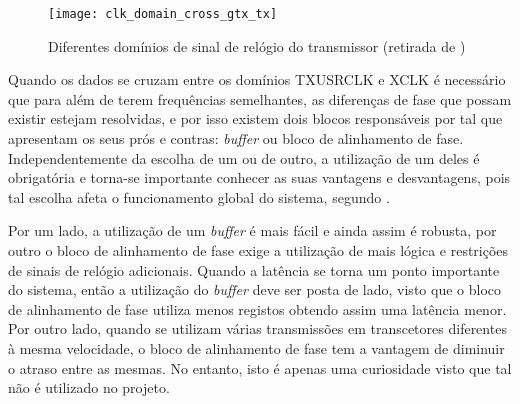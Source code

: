\begin{figure}[h!]
	\begin{center}
		\leavevmode
		\texttt{[image: clk\_domain\_cross\_gtx\_tx]}
		\caption[Diferentes domínios de sinal de relógio do transmissor]{Diferentes domínios de sinal de relógio do transmissor (retirada de \cite{R011})}
		\label{fig:clk_domains_tx}
	\end{center}
\end{figure}

Quando os dados se cruzam entre os domínios TXUSRCLK e XCLK é necessário que para além de terem frequências semelhantes, as diferenças de fase que possam existir estejam resolvidas, e por isso existem dois blocos responsáveis por tal que apresentam os seus prós e contras: \textit{buffer} ou bloco de alinhamento de fase. Independentemente da escolha de um ou de outro, a utilização de um deles é obrigatória e torna-se importante conhecer as suas vantagens e desvantagens, pois tal escolha afeta o funcionamento global do sistema, segundo \cite{R011}.

Por um lado, a utilização de um \textit{buffer} é mais fácil e ainda assim é robusta, por outro o bloco de alinhamento de fase exige a utilização de mais lógica e restrições de sinais de relógio adicionais. Quando a latência se torna um ponto importante do sistema, então a utilização do \textit{buffer} deve ser posta de lado, visto que o bloco de alinhamento de fase utiliza menos registos obtendo assim uma latência menor. Por outro lado, quando se utilizam várias transmissões em transcetores diferentes à mesma velocidade, o bloco de alinhamento de fase tem a vantagem de diminuir o atraso entre as mesmas. No entanto, isto é apenas uma curiosidade visto que tal não é utilizado no projeto.

